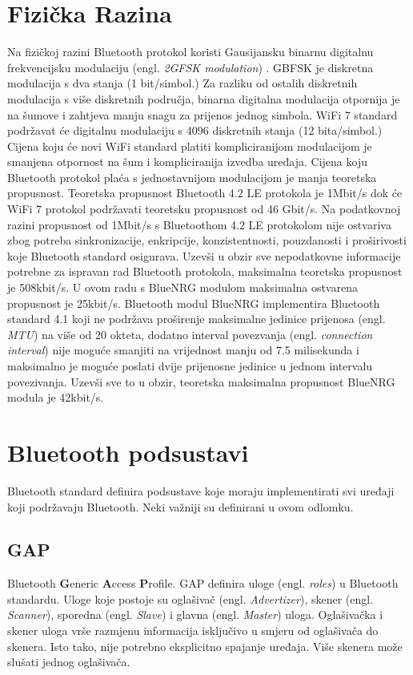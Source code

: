\documentclass[times, utf8, diplomski]{diplomski}
\begin{document}
\section {Fizička Razina}
Na fizičkoj razini Bluetooth protokol koristi Gausijansku binarnu digitalnu frekvencijsku modulaciju (engl. \textit{2GFSK modulation}) \cite{GBFSK}.
GBFSK je diskretna modulacija s dva stanja (1 bit/simbol.)
Za razliku od ostalih diskretnih modulacija s više diskretnih područja, binarna digitalna modulacija otpornija je na šumove i zahtjeva manju snagu za prijenos jednog simbola.
WiFi 7 standard podržavat će digitalnu modulaciju s 4096 diskretnih stanja \cite{wifimax} (12 bita/simbol.)
Cijena koju će novi WiFi standard platiti kompliciranijom modulacijom je smanjena otpornost na šum i kompliciranija izvedba uređaja.
Cijena koju Bluetooth protokol plaća s jednostavnijom modulacijom je manja teoretska propusnost.
Teoretska propusnost Bluetooth 4.2 LE protokola je 1Mbit/s \cite{maxtrough} dok će WiFi 7 protokol podržavati teoretsku propusnost od 46 Gbit/s.
Na podatkovnoj razini propusnost od 1Mbit/s s Bluetoothom 4.2 LE protokolom nije ostvariva zbog potreba sinkronizacije, enkripcije, konzistentnosti, pouzdanosti i proširivosti koje Bluetooth standard osigurava.
Uzevši u obzir sve nepodatkovne informacije potrebne za ispravan rad Bluetooth protokola, maksimalna teoretska propusnost je 508kbit/s.
U ovom radu s BlueNRG modulom maksimalna ostvarena propusnost je 25kbit/s.
Bluetooth modul BlueNRG implementira Bluetooth standard 4.1 koji ne podržava proširenje maksimalne jedinice prijenosa (engl. \textit{MTU}) na više od 20 okteta, dodatno interval povezvanja (engl. \textit{connection interval}) nije moguće smanjiti na vrijednost manju od 7.5 milisekunda i maksimalno je moguće poslati dvije prijenosne jedinice u jednom intervalu povezivanja.
Uzevši sve to u obzir, teoretska maksimalna propusnost BlueNRG modula je 42kbit/s.

\section{Bluetooth podsustavi}
Bluetooth standard definira podsustave koje moraju implementirati svi uređaji koji podržavaju Bluetooth. Neki važniji su definirani u ovom odlomku.

\subsection{GAP}
Bluetooth \textbf{G}eneric \textbf{A}ccess \textbf{P}rofile.
GAP definira uloge (engl. \textit{roles}) u Bluetooth standardu. Uloge koje postoje su oglašivač (engl. \textit{Advertizer}), skener (engl. \textit{Scanner}), sporedna (engl. \textit{Slave}) i glavna (engl. \textit{Master}) uloga. Oglašivačka i skener uloga vrše razmjenu informacija isključivo u smjeru od oglašivača do skenera. Isto tako, nije potrebno eksplicitno spajanje uređaja.
Više skenera može slušati jednog oglašivača.
\end{document}
